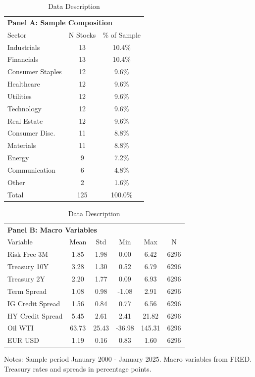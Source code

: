 
\begin{table}[htbp]
\centering
\caption{Data Description}
\label{tab:data_description}
\small
\begin{tabular}{lcc}
\toprule
\multicolumn{3}{l}{\textbf{Panel A: Sample Composition}} \\
Sector & N Stocks & \% of Sample \\
\midrule
Industrials & 13 & 10.4\% \\
Financials & 13 & 10.4\% \\
Consumer Staples & 12 & 9.6\% \\
Healthcare & 12 & 9.6\% \\
Utilities & 12 & 9.6\% \\
Technology & 12 & 9.6\% \\
Real Estate & 12 & 9.6\% \\
Consumer Disc. & 11 & 8.8\% \\
Materials & 11 & 8.8\% \\
Energy & 9 & 7.2\% \\
Communication & 6 & 4.8\% \\
Other & 2 & 1.6\% \\
\midrule
Total & 125 & 100.0\% \\
\bottomrule
\end{tabular}

\vspace{0.5cm}

\begin{tabular}{lccccc}
\toprule
\multicolumn{6}{l}{\textbf{Panel B: Macro Variables}} \\
Variable & Mean & Std & Min & Max & N \\
\midrule
Risk Free 3M & 1.85 & 1.98 & 0.00 & 6.42 & 6296 \\
Treasury 10Y & 3.28 & 1.30 & 0.52 & 6.79 & 6296 \\
Treasury 2Y & 2.20 & 1.77 & 0.09 & 6.93 & 6296 \\
Term Spread & 1.08 & 0.98 & -1.08 & 2.91 & 6296 \\
IG Credit Spread & 1.56 & 0.84 & 0.77 & 6.56 & 6296 \\
HY Credit Spread & 5.45 & 2.61 & 2.41 & 21.82 & 6296 \\
Oil WTI & 63.73 & 25.43 & -36.98 & 145.31 & 6296 \\
EUR USD & 1.19 & 0.16 & 0.83 & 1.60 & 6296 \\
\bottomrule
\end{tabular}
\begin{tablenotes}\small
\item Notes: Sample period January 2000 - January 2025. Macro variables from FRED. Treasury rates and spreads in percentage points.
\end{tablenotes}
\end{table}

